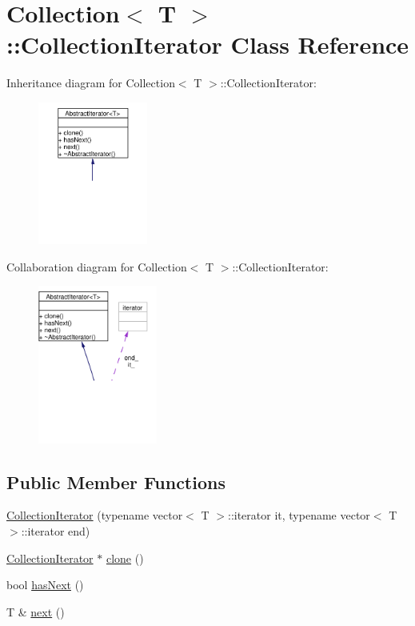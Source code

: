 \hypertarget{classCollection_1_1CollectionIterator}{
\section{Collection$<$ T $>$::Collection\-Iterator Class Reference}
\label{classCollection_1_1CollectionIterator}
}
Inheritance diagram for Collection$<$ T $>$::Collection\-Iterator:\begin{figure}[H]
\begin{center}
\leavevmode
\includegraphics[width=102pt]{classCollection_1_1CollectionIterator__inherit__graph}
\end{center}
\end{figure}
Collaboration diagram for Collection$<$ T $>$::Collection\-Iterator:\begin{figure}[H]
\begin{center}
\leavevmode
\includegraphics[width=111pt]{classCollection_1_1CollectionIterator__coll__graph}
\end{center}
\end{figure}
\subsection*{Public Member Functions}
\begin{CompactItemize}
\item 
\hyperlink{classCollection_1_1CollectionIterator_a0}{Collection\-Iterator} (typename vector$<$ T $>$::iterator it, typename vector$<$ T $>$::iterator end)
\item 
\hyperlink{classCollection_1_1CollectionIterator}{Collection\-Iterator} $\ast$ \hyperlink{classCollection_1_1CollectionIterator_a1}{clone} ()
\item 
bool \hyperlink{classCollection_1_1CollectionIterator_a2}{has\-Next} ()
\item 
T \& \hyperlink{classCollection_1_1CollectionIterator_a3}{next} ()
\end{CompactItemize}
